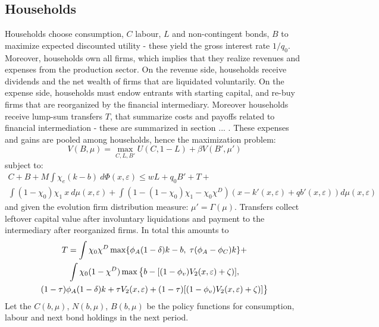 \documentclass[12pt]{article}
\begin{document}
\subsection{Households}\label{sec:hh}
Households choose consumption, $C$ labour, $L$ and non-contingent bonds, $B$ to maximize expected discounted utility - these yield the gross interest rate $1/q_0$. Moreover, households own all firms, which implies that they realize revenues and expenses from the production sector. On the revenue side, households receive dividends and the net wealth of firms that are liquidated voluntarily. On the expense side, households must endow entrants with starting capital, and re-buy firms that are reorganized by the financial intermediary. Moreover households receive lump-sum transfers $T$, that summarize costs and payoffs related to financial intermediation - these are summarized in section ... . These expenses and gains are pooled among households, hence the maximization problem:
\begin{equation} \label{eq:U_max}
V(B, \mu) = \max_{C,L,B'} U(C, 1-L) + \beta V(B', \mu')
\end{equation}  
subject to: 
\begin{multline} \label{eq:const_hh}
C + B + M \int  \chi_e (k-b) \ d \Phi(x,\varepsilon)  \leq wL + q_0 B' + T + \\  \int (1 - \chi_0) \chi_1 \ x \ d \mu(x,\varepsilon) + \int (1-(1-\chi_0)\chi_1-\chi_0\chi^D) \left( x - k'(x,\varepsilon) + qb'(x,\varepsilon) \right) d \mu(x,\varepsilon)
\end{multline} 
and given the evolution firm distribution measure: $\mu' = \Gamma(\mu)$. Transfers collect leftover capital value after involuntary liquidations and payment to the intermediary after reorganized firms. In total this amounts to 
\begin{multline*} \label{eq:T}
    T = \int \chi_0\chi^D  \max \{\phi_A (1-\delta) k - b, \hspace{1mm} \tau (\phi_A-\phi_C) k  \}  + \\
    \int \chi_0(1-\chi^D) \max \big{\{}b - [(1- \phi_v) V_2 (x, \varepsilon) + \zeta)], \\ (1-\tau)\phi_A(1-\delta)k + \tau V_2 (x, \varepsilon) + (1-\tau) [(1- \phi_v) V_2 (x, \varepsilon) + \zeta)]\big{\}} 
\end{multline*} 
Let the $C(b,\mu)$, $N(b,\mu)$, $B(b,\mu)$ be the policy functions for consumption, labour and next bond holdings in the next period. 
\end{document}

